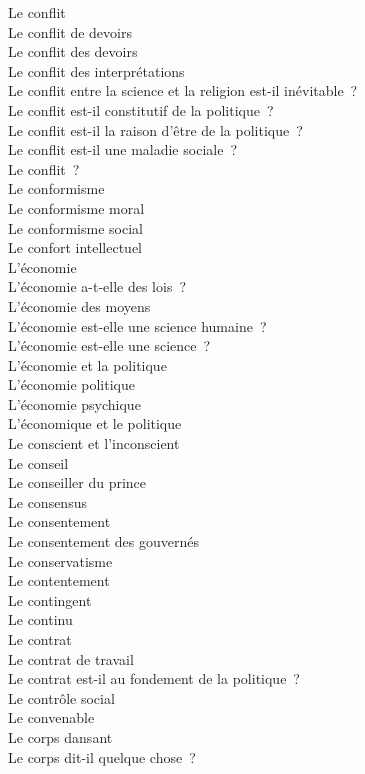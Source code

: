 \documentclass[a4paper,12pt]{article}
\begin{document}
Le conflit \\
Le conflit de devoirs \\
Le conflit des devoirs \\
Le conflit des interprétations \\
Le conflit entre la science et la religion est-il inévitable ? \\
Le conflit est-il constitutif de la politique ? \\
Le conflit est-il la raison d'être de la politique ? \\
Le conflit est-il une maladie sociale ? \\
Le conflit ? \\
Le conformisme \\
Le conformisme moral \\
Le conformisme social \\
Le confort intellectuel \\
L'économie \\
L'économie a-t-elle des lois ? \\
L'économie des moyens \\
L'économie est-elle une science humaine ? \\
L'économie est-elle une science ? \\
L'économie et la politique \\
L'économie politique \\
L'économie psychique \\
L'économique et le politique \\
Le conscient et l'inconscient \\
Le conseil \\
Le conseiller du prince \\
Le consensus \\
Le consentement \\
Le consentement des gouvernés \\
Le conservatisme \\
Le contentement \\
Le contingent \\
Le continu \\
Le contrat \\
Le contrat de travail \\
Le contrat est-il au fondement de la politique ? \\
Le contrôle social \\
Le convenable \\
Le corps dansant \\
Le corps dit-il quelque chose ? \\
\end{document}
